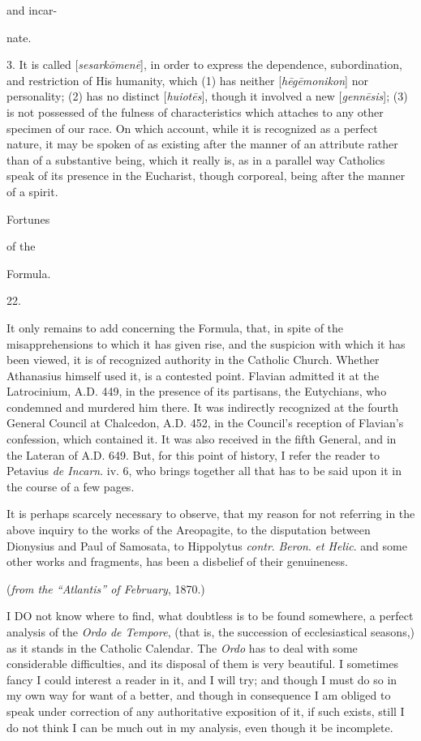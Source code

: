 and incar-

nate.

3. It is called [\emph{sesark\={o}men\={e}}],
in order to express the dependence, subordination, and
restriction of His humanity, which (1) has neither [\emph{h\={e}g\={e}monikon}]
nor personality; (2) has no distinct [\emph{huiot\={e}s}],
though it involved a new [\emph{genn\={e}sis}]; (3) is not
possessed of the fulness of characteristics which attaches to
any other specimen of our race. On which account, while it is
recognized as a perfect nature, it may be spoken of as
existing after the manner of an attribute rather than of a
substantive being, which it really is, as in a parallel way
Catholics speak of its presence in the Eucharist, though
corporeal, being after the manner of a spirit.

Fortunes

of the

Formula.

22.

It only remains to
add concerning the Formula, that, in spite of the
misapprehensions to which it has given rise, and the suspicion
with which it has been viewed, it is of recognized authority
in the Catholic Church. Whether Athanasius himself used it, is
a contested point. Flavian admitted it at the Latrocinium, A.D.
449, in the presence of its partisans, the Eutychians, who
condemned and murdered him there. It was indirectly recognized
at the fourth General Council at Chalcedon, A.D. 452,
in the Council's reception of Flavian's confession, which
contained it. It was also received in the fifth General, and
in the Lateran of A.D.
649. But, for this point of history, I refer the reader to
Petavius \emph{de Incarn}. iv. 6, who brings together all that
has to be said upon it in the course of a few pages.

It is perhaps
scarcely necessary to observe, that my reason for not
referring in the above inquiry to the works of the Areopagite,
to the disputation between Dionysius and Paul of Samosata, to
Hippolytus \emph{contr}. \emph{Beron}. \emph{et Helic}. and
some other works and fragments, has been a disbelief of their
genuineness.


(\emph{from
the ``Atlantis'' of February}, 1870.)


I DO
not know where to find, what doubtless is to be found somewhere, a
perfect analysis of the \emph{Ordo de Tempore}, (that is, the
succession of ecclesiastical seasons,) as it stands in the Catholic
Calendar. The \emph{Ordo} has to deal with some considerable
difficulties, and its disposal of them is very beautiful. I sometimes
fancy I could interest a reader in it, and I will try; and though I
must do so in my own way for want of a better, and though in
consequence I am obliged to speak under correction of any
authoritative exposition of it, if such exists, still I do not think I
can be much out in my analysis, even though it be incomplete.

